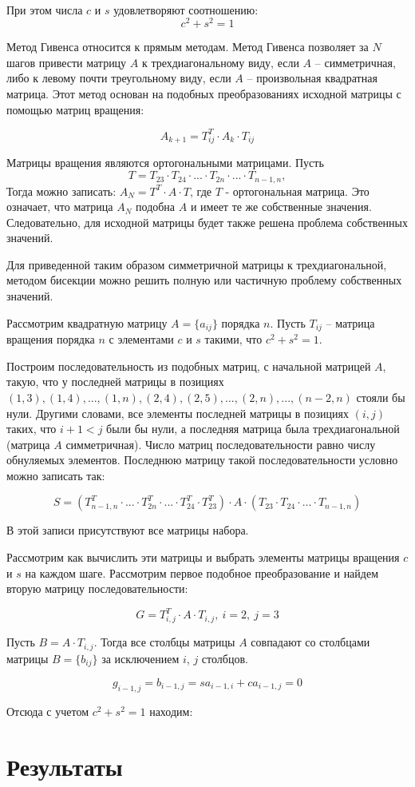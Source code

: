 \documentclass[12pt,a4paper]{article}
\begin{document}
\

При этом числа $c$ и $s$ удовлетворяют соотношению: 
$$ c^2 + s^2 = 1 $$

Метод Гивенса относится к прямым методам. Метод Гивенса позволяет за $N$ шагов привести матрицу $A$ к трехдиагональному виду, если $A$ -- симметричная, либо к левому почти треугольному виду, если $A$ -- произвольная квадратная матрица. Этот метод основан на подобных преобразованиях исходной матрицы с помощью матриц вращения:

$$ A_{k+1} = T_{ij}^T \cdot A_k \cdot T_{ij} $$

Матрицы вращения являются ортогональными матрицами. Пусть 
$$ T = T_{23} \cdot T_{24} \cdot ... \cdot T_{2n} \cdot ... \cdot T_{n-1,n},$$
Тогда можно записать: $ A_N = T^T \cdot A \cdot T $, где $T$ - ортогональная матрица. Это означает, что матрица $A_N$ подобна $A$ и имеет те же собственные значения. Следовательно, для исходной матрицы будет также решена проблема собственных значений.

Для приведенной таким образом симметричной матрицы к трехдиагональной, методом бисекции можно решить полную или частичную проблему собственных значений. 

Рассмотрим квадратную матрицу $A = \{ a_{ij} \}$ порядка $n$. Пусть $T_{ij}$ -- матрица вращения порядка $n$ с элементами $c$ и $s$ такими, что $c^2 + s^2 = 1$. 

Построим последовательность из подобных матриц, с начальной матрицей $A$, такую, что у последней матрицы в позициях $(1,3), (1,4), ..., (1,n), (2,4), (2,5), ..., (2, n), ..., (n-2,n)$ стояли бы нули. Другими словами, все элементы последней матрицы в позициях $(i, j)$ таких, что $i + 1 < j$ были бы нули, а последняя матрица была трехдиагональной (матрица $A$ симметричная). Число матриц последовательности равно числу обнуляемых элементов. Последнюю матрицу такой последовательности условно можно записать так:

$$
 S = 
 (
  T_{n-1,n}^T \cdot ... \cdot T_{2n}^T \cdot ... \cdot T_{24}^T \cdot T_{23}^T
 ) 
 \cdot A \cdot
 (T_{23} \cdot T_{24} \cdot ... \cdot T_{n-1,n})
$$

В этой записи присутствуют все матрицы набора.

Рассмотрим как вычислить эти матрицы и выбрать элементы матрицы вращения $c$ и $s$ на каждом шаге. Рассмотрим первое подобное преобразование и найдем вторую матрицу последовательности:

$$
 G = T_{i,j}^T \cdot A \cdot T_{i,j}, \ i=2, \ j=3
$$

Пусть $B = A \cdot T_{i,j}$. Тогда все столбцы матрицы $A$ совпадают со столбцами матрицы $B = \{ b_{ij} \} $ за исключением $i$, $j$ столбцов.

$$
 g_{i-1,j} = b_{i-1,j} = sa_{i-1,i} + ca_{i-1,j} = 0
$$

Отсюда с учетом $c^2 + s^2 = 1$ находим:



\section{Результаты}
\end{document}
